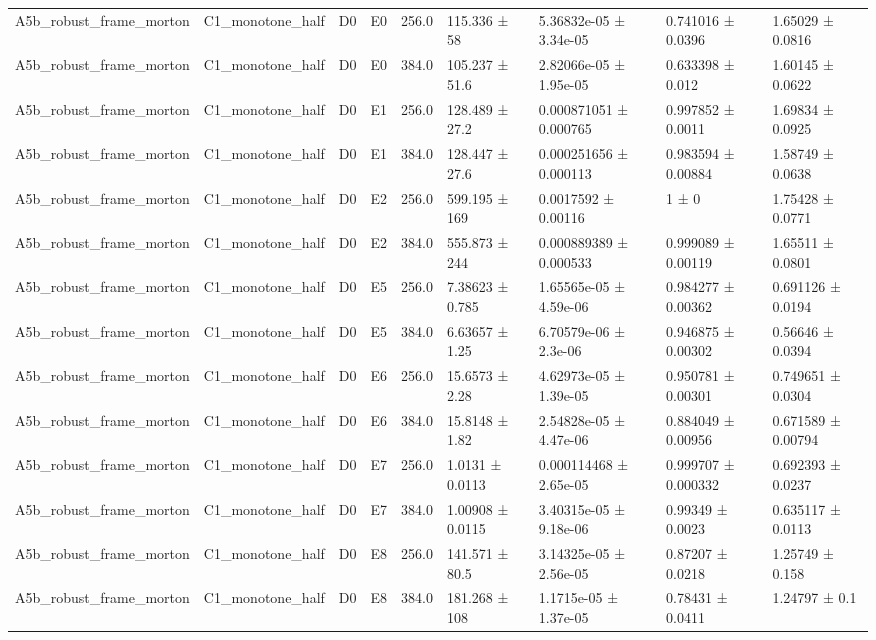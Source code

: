 \begin{table}
\begin{tabular}{lllllllll}
A5b\_robust\_frame\_morton & C1\_monotone\_half & D0 & E0 & 256.0 & 115.336 ± 58 & 5.36832e-05 ± 3.34e-05 & 0.741016 ± 0.0396 & 1.65029 ± 0.0816 \\
A5b\_robust\_frame\_morton & C1\_monotone\_half & D0 & E0 & 384.0 & 105.237 ± 51.6 & 2.82066e-05 ± 1.95e-05 & 0.633398 ± 0.012 & 1.60145 ± 0.0622 \\
A5b\_robust\_frame\_morton & C1\_monotone\_half & D0 & E1 & 256.0 & 128.489 ± 27.2 & 0.000871051 ± 0.000765 & 0.997852 ± 0.0011 & 1.69834 ± 0.0925 \\
A5b\_robust\_frame\_morton & C1\_monotone\_half & D0 & E1 & 384.0 & 128.447 ± 27.6 & 0.000251656 ± 0.000113 & 0.983594 ± 0.00884 & 1.58749 ± 0.0638 \\
A5b\_robust\_frame\_morton & C1\_monotone\_half & D0 & E2 & 256.0 & 599.195 ± 169 & 0.0017592 ± 0.00116 & 1 ± 0 & 1.75428 ± 0.0771 \\
A5b\_robust\_frame\_morton & C1\_monotone\_half & D0 & E2 & 384.0 & 555.873 ± 244 & 0.000889389 ± 0.000533 & 0.999089 ± 0.00119 & 1.65511 ± 0.0801 \\
A5b\_robust\_frame\_morton & C1\_monotone\_half & D0 & E5 & 256.0 & 7.38623 ± 0.785 & 1.65565e-05 ± 4.59e-06 & 0.984277 ± 0.00362 & 0.691126 ± 0.0194 \\
A5b\_robust\_frame\_morton & C1\_monotone\_half & D0 & E5 & 384.0 & 6.63657 ± 1.25 & 6.70579e-06 ± 2.3e-06 & 0.946875 ± 0.00302 & 0.56646 ± 0.0394 \\
A5b\_robust\_frame\_morton & C1\_monotone\_half & D0 & E6 & 256.0 & 15.6573 ± 2.28 & 4.62973e-05 ± 1.39e-05 & 0.950781 ± 0.00301 & 0.749651 ± 0.0304 \\
A5b\_robust\_frame\_morton & C1\_monotone\_half & D0 & E6 & 384.0 & 15.8148 ± 1.82 & 2.54828e-05 ± 4.47e-06 & 0.884049 ± 0.00956 & 0.671589 ± 0.00794 \\
A5b\_robust\_frame\_morton & C1\_monotone\_half & D0 & E7 & 256.0 & 1.0131 ± 0.0113 & 0.000114468 ± 2.65e-05 & 0.999707 ± 0.000332 & 0.692393 ± 0.0237 \\
A5b\_robust\_frame\_morton & C1\_monotone\_half & D0 & E7 & 384.0 & 1.00908 ± 0.0115 & 3.40315e-05 ± 9.18e-06 & 0.99349 ± 0.0023 & 0.635117 ± 0.0113 \\
A5b\_robust\_frame\_morton & C1\_monotone\_half & D0 & E8 & 256.0 & 141.571 ± 80.5 & 3.14325e-05 ± 2.56e-05 & 0.87207 ± 0.0218 & 1.25749 ± 0.158 \\
A5b\_robust\_frame\_morton & C1\_monotone\_half & D0 & E8 & 384.0 & 181.268 ± 108 & 1.1715e-05 ± 1.37e-05 & 0.78431 ± 0.0411 & 1.24797 ± 0.1 \\

\end{tabular}
\end{table}
